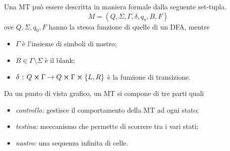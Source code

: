\documentclass{subfiles}
\begin{document}
Una MT può essere descritta in maniera formale dalla seguente set-tupla.
\[
    M = (Q, \Sigma, \Gamma, \delta, q_{o}, B, F)
\]
ove \(Q, \Sigma, q_{0}, F\) hanno la stessa funzione di quelle di un DFA, mentre
\begin{itemize}
    \item \(\Gamma\) è l'insieme di simboli di nastro;
    \item \(B \in \Gamma \setminus \Sigma\) è il blank;
    \item \(\delta \such Q \cp \Gamma \to Q \cp \Gamma \cp \Set{L, R}\) è la funzione di transizione.
\end{itemize}

\noindent Da un punto di vista grafico, un MT si compone di tre parti quali
\begin{itemize}
    \item \emph{controllo:} gestisce il comportamento della MT ad ogni stato;
    \item \emph{testina:} meccanismo che permette di scorrere tra i vari stati;
    \item \emph{nastro:} una sequenza infinita di celle.
\end{itemize}
\end{document}
